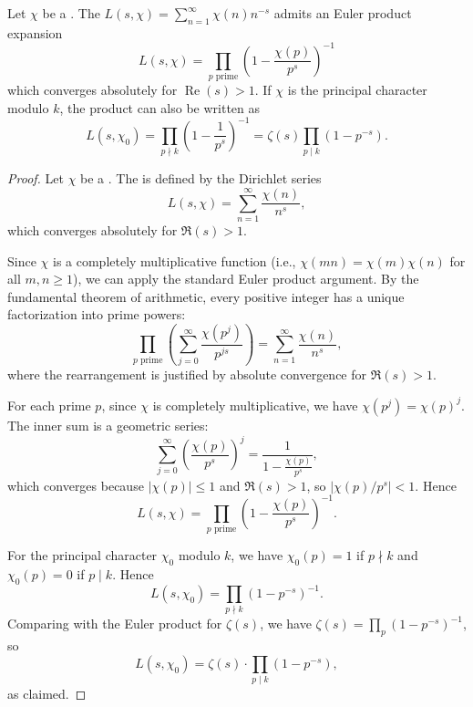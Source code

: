 \begin{theorem} \label{theorem:euler_product_for_dirichlet_L_function_of_a_dirichlet_character}
Let $\chi$ be a . The  $L(s, \chi) = \sum_{n=1}^\infty \chi(n) n^{-s}$ admits an Euler product expansion
$$
\boxed{ L(s, \chi) = \prod_{p \text{ prime}} \left( 1 - \frac{\chi(p)}{p^s} \right)^{-1} }
$$
which converges absolutely for $\operatorname{Re}(s) > 1$. If $\chi$ is the principal character modulo $k$, the product can also be written as
$$
L(s, \chi_0) = \prod_{p \nmid k} \left( 1 - \frac{1}{p^s} \right)^{-1} = \zeta(s) \prod_{p \mid k} \left( 1 - p^{-s} \right).
$$
\end{theorem}

\begin{proof}
    Let $\chi$ be a . The  is defined by the Dirichlet series
    $$L(s, \chi) = \sum_{n=1}^\infty \frac{\chi(n)}{n^s},$$
    which converges absolutely for $\Re(s) > 1$.

    Since $\chi$ is a completely multiplicative function (i.e., $\chi(mn) = \chi(m)\chi(n)$ for all $m,n \geq 1$), we can apply the standard Euler product argument. By the fundamental theorem of arithmetic, every positive integer has a unique factorization into prime powers:
    $$\prod_{p \text{ prime}} \left( \sum_{j=0}^\infty \frac{\chi(p^j)}{p^{js}} \right) = \sum_{n=1}^\infty \frac{\chi(n)}{n^s},$$
    where the rearrangement is justified by absolute convergence for $\Re(s) > 1$.

    For each prime $p$, since $\chi$ is completely multiplicative, we have $\chi(p^j) = \chi(p)^j$. The inner sum is a geometric series:
    $$\sum_{j=0}^\infty \left(\frac{\chi(p)}{p^s}\right)^j = \frac{1}{1 - \frac{\chi(p)}{p^s}},$$
    which converges because $|\chi(p)| \leq 1$ and $\Re(s) > 1$, so $|\chi(p)/p^s| < 1$. Hence
    $$L(s, \chi) = \prod_{p \text{ prime}} \left(1 - \frac{\chi(p)}{p^s}\right)^{-1}.$$

    For the principal character $\chi_0$ modulo $k$, we have $\chi_0(p) = 1$ if $p \nmid k$ and $\chi_0(p) = 0$ if $p \mid k$. Hence
    $$L(s, \chi_0) = \prod_{p \nmid k} \left(1 - p^{-s}\right)^{-1}.$$
    Comparing with the Euler product for $\zeta(s)$, we have $\zeta(s) = \prod_p (1 - p^{-s})^{-1}$, so
    $$L(s, \chi_0) = \zeta(s) \cdot \prod_{p \mid k} \left(1 - p^{-s}\right),$$
    as claimed.
\end{proof}